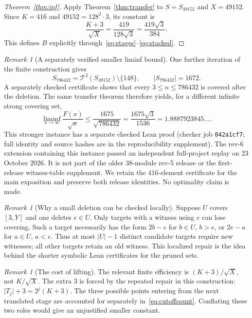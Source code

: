 \documentclass[11pt]{article}
\theoremstyle{definition}\newtheorem{definition}[theorem]{Definition}
\theoremstyle{remark}\newtheorem{remark}[theorem]{Remark}
\numberwithin{equation}{section}
\newcommand{\card}[1]{\lvert #1\rvert}
\newcommand{\lf}{\mathcal T}
\begin{document}
\begin{proof}[Theorem~\ref{thm:inf}]
Apply Theorem~\ref{thm:transfer} to $S=S_{49152}$ and $X=49152$. Since $K=416$ and $49152=128^2\cdot3$, its constant is
\[
\frac{K+3}{\sqrt X}=\frac{419}{128\sqrt3}=\frac{419\sqrt3}{384}.
\]
This defines $B$ explicitly through~\eqref{eq:stages}--\eqref{eq:stacked}.
\end{proof}

\begin{remark}[A separately verified smaller liminf bound]\label{rem:smaller}
One further iteration of the finite construction gives
\[
S_{786432}=\lf^2(S_{49152})\setminus\{148\},\qquad
\card{S_{786432}}=1672.
\]
A separately checked certificate shows that every $3\le n\le786432$ is covered after the deletion. The same transfer theorem therefore yields, for a different infinite strong covering set,
\[
\liminf_{x\to\infty}\frac{F(x)}{\sqrt x}
\le \frac{1675}{\sqrt{786432}}=\frac{1675\sqrt3}{1536}
=1.8887923845\ldots .
\]
This stronger instance has a separate checked Lean proof (checker job
\texttt{042a1cf7}; full identity and source hashes are in the reproducibility
supplement). The rev-6 extension containing this instance passed an independent
full-project replay on 23 October 2026. It is not part of the older 38-module
rev-5 release or the first-release witness-table supplement. We retain the
416-element certificate for the main exposition and preserve both release
identities. No optimality claim is made.
\end{remark}

\begin{remark}[Why a small deletion can be checked locally]
Suppose $U$ covers $[3,Y]$ and one deletes $e\in U$. Only targets with a witness using $e$ can lose covering. Such a target necessarily has the form $2b-e$ for $b\in U$, $b>e$, or $2e-a$ for $a\in U$, $a<e$. Thus at most $\card U-1$ distinct candidate targets require new witnesses; all other targets retain an old witness. This localized repair is the idea behind the shorter symbolic Lean certificates for the pruned sets.
\end{remark}

\begin{remark}[The cost of lifting]
The relevant finite efficiency is $(K+3)/\sqrt X$, not $K/\sqrt X$. The extra 3 is forced by the repeated repair in this construction: $\card{T_j}+3=2^j(K+3)$. The three possible points entering from the next translated stage are accounted for separately in~\eqref{eq:cutoffcount}. Conflating these two roles would give an unjustified smaller constant.
\end{remark}
\end{document}

